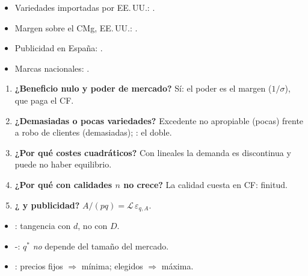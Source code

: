 \documentclass{article}
\begin{document}
\begin{columnas}
\anexorepaso
{}
\begin{itemize}
\item Variedades importadas por EE.\,UU.: .
\item Margen sobre el CMg, EE.\,UU.: .
\item Publicidad en España: .
\item Marcas nacionales: .
\end{itemize}
\begin{enumerate}
\item \textbf{¿Beneficio nulo y poder de mercado?} Sí: el poder es el margen ($1/\sigma$), que paga el CF.
\item \textbf{¿Demasiadas o pocas variedades?} Excedente no apropiable (pocas) frente a robo de clientes (demasiadas); : el doble.
\item \textbf{¿Por qué costes cuadráticos?} Con lineales la demanda es discontinua y puede no haber equilibrio.
\item \textbf{¿Por qué con calidades $n$ no crece?} La calidad cuesta en CF: finitud.
\item \textbf{¿ y publicidad?} $A/(pq)=\mathcal{L}\,\varepsilon_{q,A}$.
\end{enumerate}
\begin{trampa}
\begin{itemize}
\item {}: tangencia con $d$, no con $D$.
\item {}-: $q^*$ \emph{no} depende del tamaño del mercado.
\item {}: precios fijos $\Rightarrow$ mínima; elegidos $\Rightarrow$ máxima.
\end{itemize}
\end{trampa}

\end{columnas}
\end{document}
